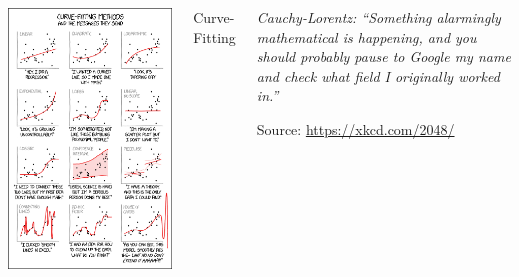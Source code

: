 
\begin{frame}
%
\begin{columns}[T]
\begin{center}
	\includegraphics[width=.67\linewidth]{./gfx/xkcd-curveFitting}
\end{center}
%
\begin{Large}
	{Curve-Fitting}
\end{Large}
%
\begin{center}
	\vspace{60pt}
	\emph{Cauchy-Lorentz: \enquote{Something alarmingly mathematical is happening, and you should probably pause to Google my name and check what field I originally worked in.}}

	\vspace{6pt}
	Source: \url{https://xkcd.com/2048/}
\end{center}
\end{columns}
%
\end{frame}


